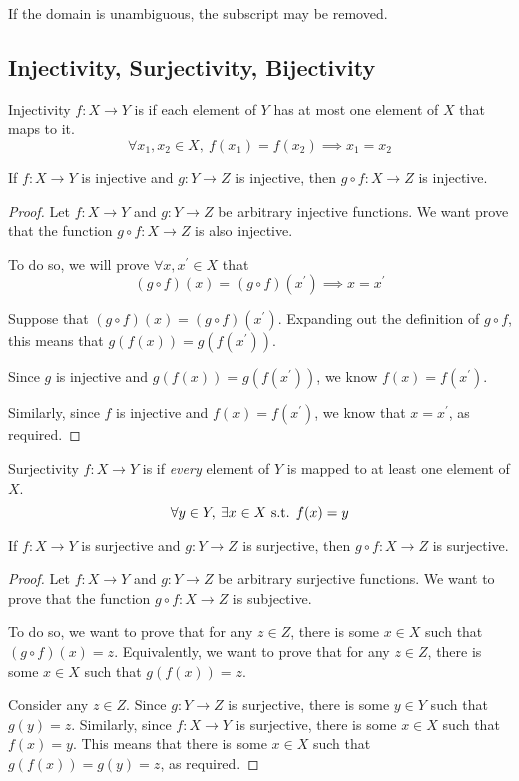 \begin{notation}
If the domain is unambiguous, the subscript may be removed.
\end{notation}
\pagebreak

\subsection{Injectivity, Surjectivity, Bijectivity}
\begin{defn}{Injectivity}{}
$f:X\to Y$ is  if each element of $Y$ has at most one element of $X$ that maps to it.
\[ \forall x_1,x_2\in X,\:f(x_1)=f(x_2) \implies x_1=x_2 \]
\end{defn}

\begin{proposition}
If $f:X \to Y$ is injective and $g:Y \to Z$ is injective, then $g \circ f:X \to Z$ is injective.
\end{proposition}
\begin{proof}
Let $f:X \to Y$ and $g:Y \to Z$ be arbitrary injective functions. We want prove that the function $g \circ f:X \to Z$ is also injective.

To do so, we will prove $\forall x,x^\prime \in X$ that 
\[ (g \circ f)(x) = (g \circ f)(x^\prime) \implies x=x^\prime \]

Suppose that $(g \circ f)(x) = (g \circ f)(x^\prime)$. Expanding out the definition of $g \circ f$, this means that $g(f(x)) = g(f(x^\prime))$.

Since $g$ is injective and $g(f(x)) = g(f(x^\prime))$, we know $f(x)=f(x^\prime)$.

Similarly, since $f$ is injective and $f(x) = f(x^\prime)$, we know that $x=x^\prime$, as required.
\end{proof}

\begin{defn}{Surjectivity}{}
$f:X\to Y$ is  if \emph{every} element of $Y$ is mapped to at least one element of $X$.
\[ \forall y\in Y,\:\exists x\in X \text{ s.t. } f(x)=y \]
\end{defn}

\begin{proposition}
If $f:X\to Y$ is surjective and $g:Y\to Z$ is surjective, then $g \circ f:X\to Z$ is surjective.
\end{proposition}
\begin{proof}
Let $f:X\to Y$ and $g:Y\to Z$ be arbitrary surjective functions. We want to prove that the function $g \circ f:X\to Z$ is subjective. 

To do so, we want to prove that for any $z \in Z$, there is some $x \in X$ such that $(g \circ f)(x) = z$. Equivalently, we want to prove that for any $z \in Z$, there is some $x \in X$ such that $g(f(x)) = z$.

Consider any $z \in Z$. Since $g:Y\to Z$ is surjective, there is some $y \in Y$ such that $g(y) = z$. Similarly, since $f:X\to Y$ is surjective, there is some $x \in X$ such that $f(x) = y$. This means that there is some $x \in X$ such that $g(f(x)) = g(y) = z$, as required.
\end{proof}

